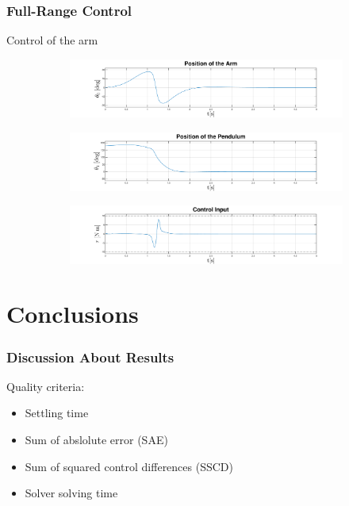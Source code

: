 \documentclass[]{beamer}
\begin{document}
\begin{frame}
	\frametitle{Full-Range Control}	
	Control of the arm
	\begin{figure}[H]
		\centering
		\begin{subfigure}
			\centering
			\includegraphics[scale=0.25]{images/Oswing/arm.pdf}  
		\end{subfigure}
		\begin{subfigure}
			\centering
			\includegraphics[scale=0.25]{images/Oswing/pend.pdf}  
		\end{subfigure}
		\begin{subfigure}
			\centering
			\includegraphics[scale=0.25]{images/Oswing/control.pdf} 
		\end{subfigure}
	\end{figure}
\end{frame}

\section{Conclusions}

\begin{frame}
	\frametitle{Discussion About Results}
	Quality criteria:
	\begin{itemize}
		\item Settling time\\
		\item Sum of abslolute error (SAE)\\
		\item Sum of squared control differences (SSCD)\\
		\item Solver solving time\\
	\end{itemize}
\end{frame}
\end{document}
